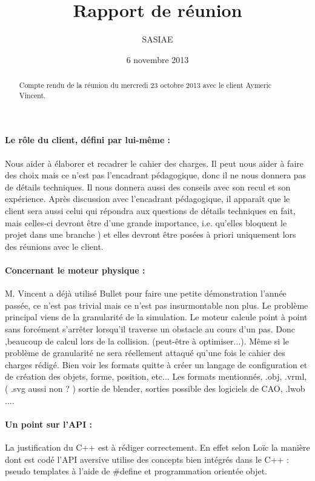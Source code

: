 \documentclass[a4paper,10pt]{article}
\title{Rapport de réunion}           %
\author{SASIAE}
\date{6 novembre 2013}
\begin{document}
\maketitle                    %

\begin{abstract}
Compte rendu de la réunion du mercredi 23 octobre 2013 avec le client Aymeric Vincent.
\end{abstract}

\paragraph{Le rôle du client, défini par lui-même :}
Nous aider à élaborer et recadrer le cahier des charges. Il peut nous aider à faire des choix mais ce n'est pas l'encadrant pédagogique, donc il ne nous donnera pas de détails techniques. Il nous donnera aussi des conseils avec son recul et son expérience. Après discussion avec l'encadrant pédagogique, il apparaît que le client sera aussi celui qui répondra aux questions de détails techniques en fait, mais celles-ci devront être d'une grande importance, i.e. qu'elles bloquent le projet dans une branche )  et elles devront être posées à priori uniquement lors des réunions avec le client.

\paragraph{Concernant le moteur physique :}
 M. Vincent a déjà utilisé Bullet pour faire une petite démonstration l'année passée, ce n'est pas trivial mais ce n'est pas insurmontable non plus. Le problème principal viens de la granularité de la simulation. Le moteur calcule point à point sans forcément s’arrêter lorsqu’il traverse un obstacle au cours d'un pas. Donc ,beaucoup de calcul lors de la collision. (peut-être à optimiser...). Même si le problème de granularité ne sera réellement attaqué qu'une fois le cahier des charges rédigé. Bien voir les formats quitte à créer un langage de configuration et de création des objets, forme, position, etc... Les formats mentionnés, .obj, .vrml, ( .svg aussi non ? ) sortie de blender, sorties possible des logiciels de CAO, .lwob ....

\paragraph{Un point sur l'API :}
La justification du C++ est à rédiger correctement. En effet selon Loïc 
la manière dont est codé l'API aversive utilise des concepts bien intégrés 
dans le C++ : pseudo templates à l'aide de \#define et programmation orientée objet.
\end{document}
